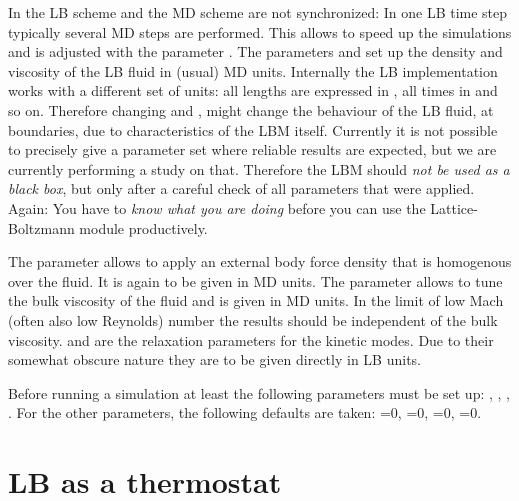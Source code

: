 In \es the LB scheme and the MD scheme are not synchronized: In one LB
time step typically several MD steps are performed. This allows to
speed up the simulations and is adjusted with the parameter .
The parameters  and  set up the density and
viscosity of the LB fluid in (usual) MD units.  Internally the LB
implementation works with a different set of units: all lengths are
expressed in , all times in  and so on.  Therefore
changing  and , might change the behaviour of the
LB fluid, \eg at boundaries, due to characteristics of the LBM
itself. Currently it is not possible to precisely give a parameter set
where reliable results are expected, but we are currently performing a
study on that. Therefore the LBM should \emph{not be used as a black
  box}, but only after a careful check of all parameters that were
applied. Again: You have to \emph{know what you are doing} before you
can use the Lattice-Boltzmann module productively.

The parameter  allows to apply an external body force
density that is homogenous over the fluid. It is again to be given in
MD units.  The parameter  allows to tune the bulk
viscosity of the fluid and is given in MD units. In the limit of low
Mach (often also low Reynolds) number the results should be
independent of the bulk viscosity.   and
 are the relaxation parameters for the kinetic
modes. Due to their somewhat obscure nature they are to be given
directly in LB units.

Before running a simulation at least the following parameters must be
set up: , , , . For the other
parameters, the following defaults are taken: =0,
=0, =0, =0.

\section{LB as a thermostat}

